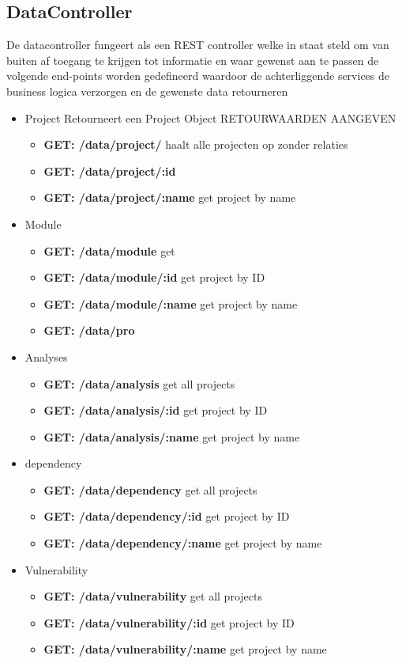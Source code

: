 \subsection{DataController}\label{subsec:datacontroller}
De datacontroller fungeert als een REST controller welke in staat steld om van buiten af toegang te krijgen tot informatie en waar gewenst aan te passen de volgende end-points worden gedefineerd waardoor de achterliggende services de business logica verzorgen en de gewenste data retourneren

\begin{itemize}
    \item Project Retourneert een Project Object RETOURWAARDEN AANGEVEN
        \begin{itemize}
            \item \textbf{GET: /data/project/} haalt alle projecten op zonder relaties
            \item \textbf{GET: /data/project/:id}
            \item \textbf{GET: /data/project/:name} get project by name
        \end{itemize}
    \item Module
    \begin{itemize}
        \item \textbf{GET: /data/module} get
        \item \textbf{GET: /data/module/:id} get project by ID
        \item \textbf{GET: /data/module/:name} get project by name
        \item \textbf{GET: /data/pro}
    \end{itemize}
    \item Analyses
    \begin{itemize}
        \item \textbf{GET: /data/analysis} get all projects
        \item \textbf{GET: /data/analysis/:id} get project by ID
        \item \textbf{GET: /data/analysis/:name} get project by name
    \end{itemize}
    \item dependency
    \begin{itemize}
        \item \textbf{GET: /data/dependency} get all projects
        \item \textbf{GET: /data/dependency/:id} get project by ID
        \item \textbf{GET: /data/dependency/:name} get project by name
    \end{itemize}
    \item Vulnerability
    \begin{itemize}
        \item \textbf{GET: /data/vulnerability} get all projects
        \item \textbf{GET: /data/vulnerability/:id} get project by ID
        \item \textbf{GET: /data/vulnerability/:name} get project by name
    \end{itemize}
\end{itemize}

